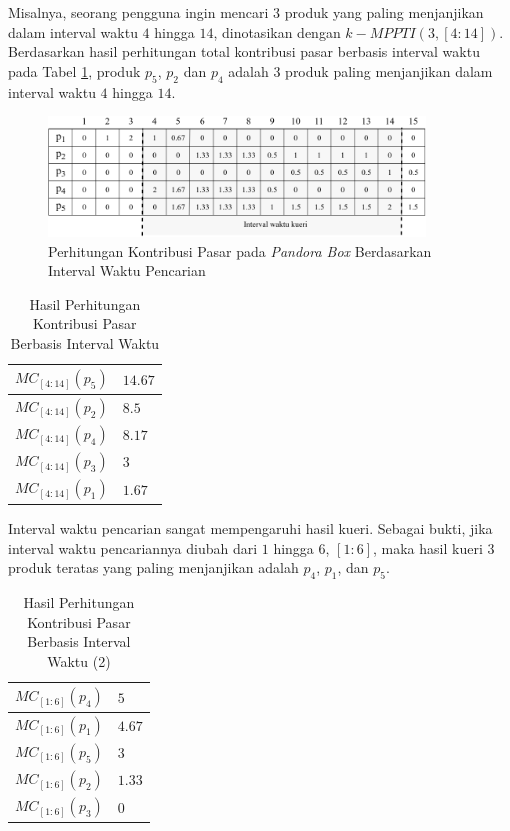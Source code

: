 Misalnya, seorang pengguna ingin mencari $3$ produk yang paling menjanjikan dalam interval waktu $4$ hingga $14$, dinotasikan dengan $k-MPPTI(3, [4:14])$. Berdasarkan hasil perhitungan total kontribusi pasar berbasis interval waktu pada Tabel \ref{tab:mc-ti-res}, produk $p_5$, $p_2$ dan $p_4$ adalah $3$ produk paling menjanjikan dalam interval waktu $4$ hingga $14$.

\begin{figure}[h]
	\centering
	\includegraphics[width=10cm]{assets/img/bab3/pbox-kueri.png}
	\caption{Perhitungan Kontribusi Pasar pada \textit{Pandora Box} Berdasarkan Interval Waktu Pencarian}
	\label{fig:pbox-kueri}
\end{figure}

\begin{table}[H]
	\small
	\centering
	\begin{tabular}{|p{3cm}|p{2cm}|}
		\hline
		$MC_{[4:14]}(p_5)$ & $14.67$ \\ \hline
		$MC_{[4:14]}(p_2)$ & $8.5$ \\ \hline
		$MC_{[4:14]}(p_4)$ & $8.17$ \\ \hline
		$MC_{[4:14]}(p_3)$ & $3$ \\ \hline
		$MC_{[4:14]}(p_1)$ & $1.67$ \\ \hline
	\end{tabular} 
	\caption{Hasil Perhitungan Kontribusi Pasar Berbasis Interval Waktu}
	\label{tab:mc-ti-res}
\end{table}

Interval waktu pencarian sangat mempengaruhi hasil kueri. Sebagai bukti, jika interval waktu pencariannya diubah dari $1$ hingga $6$, $[1:6]$, maka hasil kueri $3$ produk teratas yang paling menjanjikan adalah $p_4$, $p_1$, dan $p_5$.

\begin{table}[H]
	\small
	\centering
	\begin{tabular}{|p{3cm}|p{2cm}|}
		\hline
		$MC_{[1:6]}(p_4)$ & $5$ \\ \hline
		$MC_{[1:6]}(p_1)$ & $4.67$ \\ \hline
		$MC_{[1:6]}(p_5)$ & $3$ \\ \hline
		$MC_{[1:6]}(p_2)$ & $1.33$ \\ \hline
		$MC_{[1:6]}(p_3)$ & $0$ \\ \hline
	\end{tabular} 
	\caption{Hasil Perhitungan Kontribusi Pasar Berbasis Interval Waktu (2)}
	\label{tab:mc-ti-res2}
\end{table}


